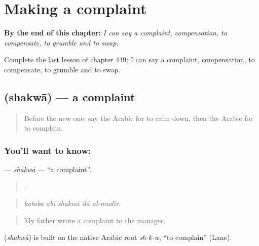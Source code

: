 
\chapter{Making a complaint}
\label{ch:ar-making-a-complaint}

\begin{chapteropening}
\textbf{By the end of this chapter:} \emph{I can say a complaint, compensation, to compensate, to grumble and to swap.}

Complete the last lesson of chapter 449: I can say a complaint, compensation, to compensate, to grumble and to swap.
\end{chapteropening}

\section[\texorpdfstring{\ar{شكوى} (shakwā)}{شكوى (shakwā)}]{ (shakwā) — a complaint}

\label{lesson:AR-C449-shakwa}



\begin{quote}
Before the new one: say the Arabic for to calm down, then the Arabic for to complain.
\end{quote}

\subsection*{You'll want to know: }
\textbf{} — \emph{shakwā} — \textquotedblleft{}a complaint\textquotedblright{}.

\begin{quote}
    .
\end{quote}

\begin{quote}
\emph{kataba abī shakwā ilā al-mudīr.}
\end{quote}

\begin{quote}
My father wrote a complaint to the manager.
\end{quote}

\begin{cousinweb}
\textbf{} (\emph{shakwā}) is built on the native Arabic root \emph{sh-k-w}, \textquotedblleft{}to complain\textquotedblright{} (Lane).
\end{cousinweb}

